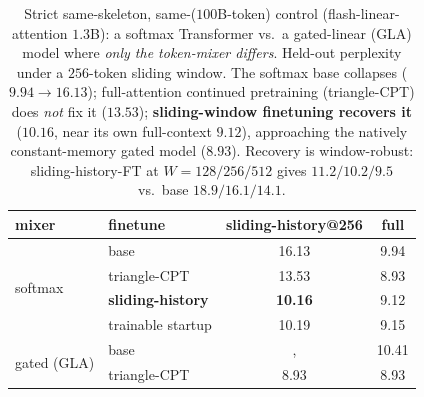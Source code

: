 \begin{table}[t]
\centering
\small
\begin{tabular}{llcc}
\toprule
mixer & finetune & sliding-history@256 & full \\
\midrule
\multirow{4}{*}{softmax} & base & 16.13 & 9.94 \\
 & triangle-CPT & 13.53 & 8.93 \\
 & \textbf{sliding-history} & \textbf{10.16} & 9.12 \\
 & trainable startup & 10.19 & 9.15 \\
\midrule
\multirow{2}{*}{gated (GLA)} & base &, & 10.41 \\
 & triangle-CPT & 8.93 & 8.93 \\
\bottomrule
\end{tabular}
\caption{Strict same-skeleton, same-($100$B-token) control (flash-linear-attention $1.3$B): a softmax Transformer vs.\ a gated-linear (GLA) model where \emph{only the token-mixer differs}. Held-out perplexity under a $256$-token sliding window. The softmax base collapses ($9.94\!\to\!16.13$); full-attention continued pretraining (triangle-CPT) does \emph{not} fix it ($13.53$); \textbf{sliding-window finetuning recovers it} ($10.16$, near its own full-context $9.12$), approaching the natively constant-memory gated model ($8.93$). Recovery is window-robust: sliding-history-FT at $W{=}128/256/512$ gives $11.2/10.2/9.5$ vs.\ base $18.9/16.1/14.1$.}
\label{tab:strict}
\end{table}
